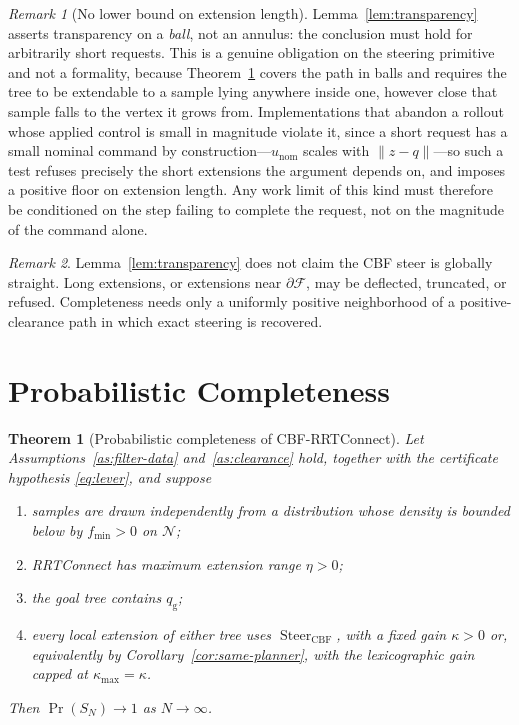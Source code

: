 \documentclass[11pt]{article}
\newtheorem{theorem}{Theorem}
\theoremstyle{remark}
\newtheorem{remark}{Remark}
\newcommand{\F}{\mathcal{F}}
\newcommand{\Nb}{\mathcal{N}}
\newcommand{\Steer}{\operatorname{Steer}_{\mathrm{CBF}}}
\newcommand{\unom}{u_{\mathrm{nom}}}
\newcommand{\kmax}{\kappa_{\max}}
\begin{document}
\begin{remark}[No lower bound on extension length]
\label{rem:no-floor}
Lemma~\ref{lem:transparency} asserts transparency on a \emph{ball}, not an annulus: the
conclusion must hold for arbitrarily short requests. This is a genuine obligation on the
steering primitive and not a formality, because
Theorem~\ref{thm:pc} covers the path in balls and requires the tree to be extendable to a
sample lying anywhere inside one, however close that sample falls to the vertex it grows
from. Implementations that abandon a rollout whose applied control is small in magnitude
violate it, since a short request has a small nominal command by construction---$\unom$
scales with $\|z-q\|$---so such a test refuses precisely the short extensions the argument
depends on, and imposes a positive floor on extension length. Any work limit of this kind
must therefore be conditioned on the step failing to complete the request, not on the
magnitude of the command alone.
\end{remark}

\begin{remark}
Lemma~\ref{lem:transparency} does not claim the CBF steer is globally straight. Long
extensions, or extensions near $\partial\F$, may be deflected, truncated, or refused.
Completeness needs only a uniformly positive neighborhood of a positive-clearance path in
which exact steering is recovered.
\end{remark}

\section{Probabilistic Completeness}
\label{sec:pc}

\begin{theorem}[Probabilistic completeness of CBF-RRTConnect]
\label{thm:pc}
Let Assumptions~\ref{as:filter-data} and~\ref{as:clearance} hold, together with the
certificate hypothesis \eqref{eq:lever}, and suppose
\begin{enumerate}[label=(\roman*)]
\item samples are drawn independently from a distribution whose density is bounded below by
      $f_{\min}>0$ on $\Nb$;
\item RRTConnect has maximum extension range $\eta>0$;
\item the goal tree contains $q_{\mathrm g}$;
\item every local extension of either tree uses $\Steer$, with a fixed gain $\kappa>0$ or,
      equivalently by Corollary~\ref{cor:same-planner}, with the lexicographic gain capped
      at $\kmax=\kappa$.
\end{enumerate}
Then $\Pr(S_N)\to1$ as $N\to\infty$.
\end{theorem}
\end{document}
